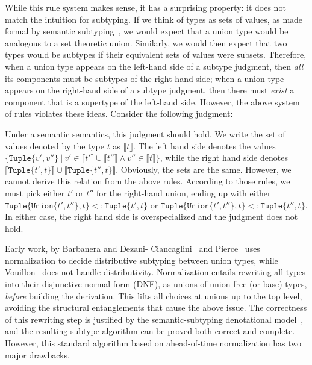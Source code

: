 \documentclass[a4paper,english]{lipics-v2019}
\newcommand{\xt}[1]{\texttt{#1}}
\newcommand{\union}[2]{\xt{Union\{}#1,#2\xt{\}}}
\newcommand{\sub}{<:}
\newcommand{\tuple}[1]{\xt{Tuple\{}#1\xt{\}}}
\begin{document}
\noindent While this rule system makes sense, it has a  surprising
property: it  does not match the intuition for subtyping. If we think
of types as sets of values, as made formal by semantic
subtyping~\cite{Pierce1991}, we would expect that a union type would be
analogous to a set theoretic union. Similarly, we would then expect that two
types would be subtypes if their equivalent sets of values were subsets.
Therefore, when a union type appears on the left-hand side of a subtype
judgment, then \emph{all} its components must be subtypes of the right-hand
side; when a union type appears on the right-hand side of a subtype judgment,
then there must \emph{exist} a component that is a supertype of the left-hand
side. However, the above system of rules violates these ideas. Consider the
following judgment:

%
\vspace{-3mm}{\small\[
\tuple{\union{t'}{t''}, t} \ \ \sub\ \ \union{\tuple{t', t}}{\tuple{t'', t}} 
\]}
\vspace{-3mm}
%

\noindent  Under a semantic semantics, this judgment should hold. We write the
set of values denoted by the type $t$ as {\small $\llbracket t \rrbracket$}.
The left hand side denotes the values {\small $\{\tuple{v',v''} ~|~ v' \in
\llbracket t' \rrbracket \cup \llbracket t'' \rrbracket \wedge v'' \in
\llbracket t \rrbracket\}$}, while the right hand side denotes {\small $\llbracket
\tuple{t', t} \rrbracket \cup \llbracket \tuple{t'', t} \rrbracket$}.
Obviously, the sets are the same. However, we cannot derive this relation from
the above rules. According to those rules, we must pick either {\small $t'$}
or {\small $t''$} for the right-hand union, ending up with either {\small
$\tuple{\union{t'}{t''}, t} \sub \tuple{t', t}$} or {\small
$\tuple{\union{t'}{t''}, t} \sub \tuple{t'', t}$}. In either case, the right
hand side is overspecialized and the judgment does not hold.

Early work, by Barbanera and Dezani-
Ciancaglini~\cite{barbanera1991intersection} and Pierce~\cite{Pierce1991} uses
normalization to decide distributive subtyping between union types, while
Vouillon~\cite{Vouillon04} does not handle distributivity. Normalization
entails rewriting all types into their disjunctive normal form (DNF), as
unions of union-free (or base) types, \emph{before} building the derivation. This lifts
all choices at unions up to the top level, avoiding the structural
entanglements that cause the above issue. The correctness of this rewriting
step is justified by the semantic-subtyping denotational
model~\cite{Frisch08}, and the resulting subtype algorithm can be proved both
correct and complete. However, this standard algorithm based on ahead-of-time
normalization has two major drawbacks.  
\end{document}
